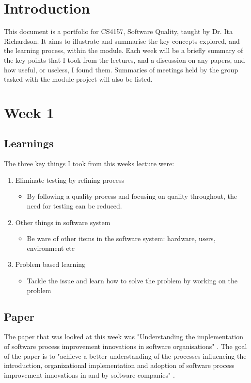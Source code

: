 \chapter{Introduction}

This document is a portfolio for CS4157, Software Quality, taught by Dr. Ita Richardson. It aims to illustrate and summarise the key concepts explored, and the learning process, within the module. Each week will be a briefly summary of the key points that I took from the lectures, and a discussion on any papers, and how useful, or useless, I found them. Summaries of meetings held by the group tasked with the module project will also be listed. 

\chapter{Week 1}
\section{Learnings}

The three key things I took from this weeks lecture were:

\begin{enumerate}
\item Eliminate testing by refining process
\begin{itemize}
\item By following a quality process and focusing on quality throughout, the need for testing can be reduced.
\end{itemize}
\item Other things in software system
\begin{itemize}
\item Be ware of other items in the software system: hardware, users, environment etc
\end{itemize}
\item Problem based learning
\begin{itemize}
\item Tackle the issue and learn how to solve the problem by working on the problem
\end{itemize}
\end{enumerate}

\section{Paper}

The paper that was looked at this week was "Understanding the implementation of software process improvement innovations in software organisations" \parencite{week1}. The goal of the paper is to "achieve a better understanding of the processes influencing the introduction, organizational implementation and adoption of software process improvement innovations in and by software companies" \parencite{week1}.

